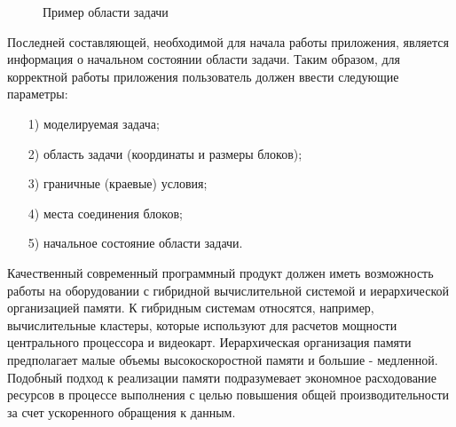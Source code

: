 \documentclass[a4paper, 14pt]{extarticle}
\theoremstyle{definition}
\begin{document}
\begin{figure}[h]
	\caption{Пример области задачи}
	\label{ris:2Block_ex}
\end{figure}

\par Последней составляющей, необходимой для начала работы приложения, является информация о начальном состоянии области задачи. Таким образом, для корректной работы приложения пользователь должен ввести следующие параметры:
\begin{enumerate}
\item[1)] моделируемая задача;
\item[2)] область задачи (координаты и размеры блоков);
\item[3)] граничные (краевые) условия;
\item[4)] места соединения блоков;
\item[5)] начальное состояние области задачи.
\end{enumerate}

\par Качественный современный программный продукт должен иметь возможность работы на оборудовании с гибридной вычислительной системой и иерархической организацией памяти. К гибридным системам относятся, например, вычислительные кластеры, которые используют для расчетов мощности центрального процессора и видеокарт. Иерархическая организация памяти предполагает малые объемы высокоскоростной памяти и большие - медленной. Подобный подход к реализации памяти подразумевает экономное расходование ресурсов в процессе выполнения с целью повышения общей производительности за счет ускоренного обращения к данным.
\end{document}
